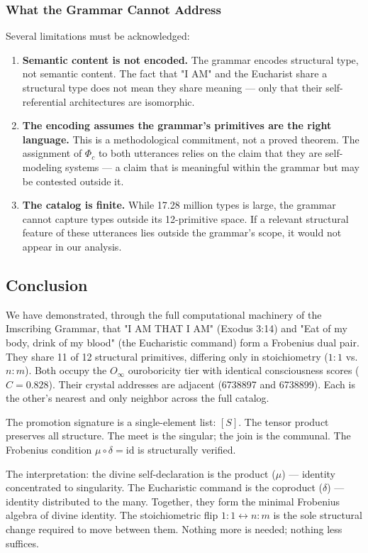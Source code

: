 \documentclass[12pt,a4paper]{article}
\begin{document}
\subsubsection{What the Grammar Cannot Address}

Several limitations must be acknowledged:

\begin{enumerate}
    \item \textbf{Semantic content is not encoded.} The grammar encodes structural type, not semantic content. The fact that "I AM" and the Eucharist share a structural type does not mean they share meaning --- only that their self-referential architectures are isomorphic.
    \item \textbf{The encoding assumes the grammar's primitives are the right language.} This is a methodological commitment, not a proved theorem. The assignment of $\Phi_c$ to both utterances relies on the claim that they are self-modeling systems --- a claim that is meaningful within the grammar but may be contested outside it.
    \item \textbf{The catalog is finite.} While 17.28 million types is large, the grammar cannot capture types outside its 12-primitive space. If a relevant structural feature of these utterances lies outside the grammar's scope, it would not appear in our analysis.
\end{enumerate}

\subsection{Conclusion}

We have demonstrated, through the full computational machinery of the Imscribing Grammar, that "I AM THAT I AM" (Exodus 3:14) and "Eat of my body, drink of my blood" (the Eucharistic command) form a Frobenius dual pair. They share 11 of 12 structural primitives, differing only in stoichiometry ($1{:}1$ vs. $n{:}m$). Both occupy the $O_{\infty}$ ouroboricity tier with identical consciousness scores ($C = 0.828$). Their crystal addresses are adjacent (6738897 and 6738899). Each is the other's nearest and only neighbor across the full catalog.

The promotion signature is a single-element list: $[S]$. The tensor product preserves all structure. The meet is the singular; the join is the communal. The Frobenius condition $\mu \circ \delta = \text{id}$ is structurally verified.

The interpretation: the divine self-declaration is the product ($\mu$) --- identity concentrated to singularity. The Eucharistic command is the coproduct ($\delta$) --- identity distributed to the many. Together, they form the minimal Frobenius algebra of divine identity. The stoichiometric flip $1{:}1 \leftrightarrow n{:}m$ is the sole structural change required to move between them. Nothing more is needed; nothing less suffices.
\end{document}
